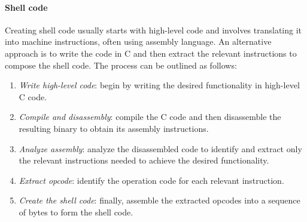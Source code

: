 \paragraph*{Shell code}
Creating shell code usually starts with high-level code and involves translating it into machine instructions, often using assembly language. 
An alternative approach is to write the code in C and then extract the relevant instructions to compose the shell code. 
The process can be outlined as follows:
\begin{enumerate}
    \item \textit{Write high-level code}: begin by writing the desired functionality in high-level C code.
    \item \textit{Compile and disassembly}: compile the C code and then disassemble the resulting binary to obtain its assembly instructions.
    \item \textit{Analyze assembly}: analyze the disassembled code to identify and extract only the relevant instructions needed to achieve the desired functionality.
    \item \textit{Extract opcode}: identify the operation code for each relevant instruction.
    \item \textit{Create the shell code}: finally, assemble the extracted opcodes into a sequence of bytes to form the shell code.
\end{enumerate}

